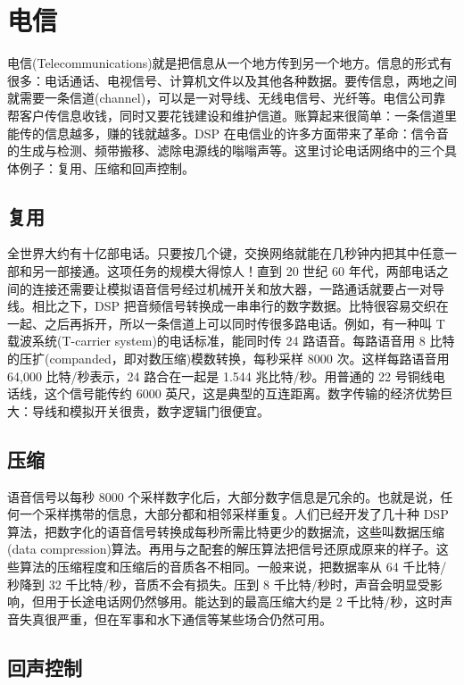 \section{电信}

电信(Telecommunications)就是把信息从一个地方传到另一个地方。信息的形式有很多：电话通话、电视信号、计算机文件以及其他各种数据。要传信息，两地之间就需要一条信道(channel)，可以是一对导线、无线电信号、光纤等。电信公司靠帮客户传信息收钱，同时又要花钱建设和维护信道。账算起来很简单：一条信道里能传的信息越多，赚的钱就越多。DSP
在电信业的许多方面带来了革命：信令音的生成与检测、频带搬移、滤除电源线的嗡嗡声等。这里讨论电话网络中的三个具体例子：复用、压缩和回声控制。

\subsection{复用}

全世界大约有十亿部电话。只要按几个键，交换网络就能在几秒钟内把其中任意一部和另一部接通。这项任务的规模大得惊人！直到
20 世纪 60
年代，两部电话之间的连接还需要让模拟语音信号经过机械开关和放大器，一路通话就要占一对导线。相比之下，DSP
把音频信号转换成一串串行的数字数据。比特很容易交织在一起、之后再拆开，所以一条信道上可以同时传很多路电话。例如，有一种叫
T 载波系统(T-carrier system)的电话标准，能同时传 24 路语音。每路语音用 8
比特的压扩(companded，即对数压缩)模数转换，每秒采样 8000
次。这样每路语音用 64,000 比特/秒表示，24 路合在一起是 1.544
兆比特/秒。用普通的 22 号铜线电话线，这个信号能传约 6000
英尺，这是典型的互连距离。数字传输的经济优势巨大：导线和模拟开关很贵，数字逻辑门很便宜。

\subsection{压缩}

语音信号以每秒 8000
个采样数字化后，大部分数字信息是冗余的。也就是说，任何一个采样携带的信息，大部分都和相邻采样重复。人们已经开发了几十种
DSP
算法，把数字化的语音信号转换成每秒所需比特更少的数据流，这些叫数据压缩(data
compression)算法。再用与之配套的解压算法把信号还原成原来的样子。这些算法的压缩程度和压缩后的音质各不相同。一般来说，把数据率从
64 千比特/秒降到 32 千比特/秒，音质不会有损失。压到 8
千比特/秒时，声音会明显受影响，但用于长途电话网仍然够用。能达到的最高压缩大约是
2 千比特/秒，这时声音失真很严重，但在军事和水下通信等某些场合仍然可用。

\subsection{回声控制}

